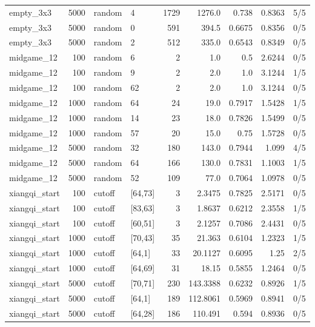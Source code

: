 \begin{table}[!t]
\begin{tabular}{lrllrrrrl}
empty\_3x3 & 5000 & random & 4 & 1729 & 1276.0 & 0.738 & 0.8363 & 5/5 \\
empty\_3x3 & 5000 & random & 0 & 591 & 394.5 & 0.6675 & 0.8356 & 0/5 \\
empty\_3x3 & 5000 & random & 2 & 512 & 335.0 & 0.6543 & 0.8349 & 0/5 \\
midgame\_12 & 100 & random & 6 & 2 & 1.0 & 0.5 & 2.6244 & 0/5 \\
midgame\_12 & 100 & random & 9 & 2 & 2.0 & 1.0 & 3.1244 & 1/5 \\
midgame\_12 & 100 & random & 62 & 2 & 2.0 & 1.0 & 3.1244 & 0/5 \\
midgame\_12 & 1000 & random & 64 & 24 & 19.0 & 0.7917 & 1.5428 & 1/5 \\
midgame\_12 & 1000 & random & 14 & 23 & 18.0 & 0.7826 & 1.5499 & 0/5 \\
midgame\_12 & 1000 & random & 57 & 20 & 15.0 & 0.75 & 1.5728 & 0/5 \\
midgame\_12 & 5000 & random & 32 & 180 & 143.0 & 0.7944 & 1.099 & 4/5 \\
midgame\_12 & 5000 & random & 64 & 166 & 130.0 & 0.7831 & 1.1003 & 1/5 \\
midgame\_12 & 5000 & random & 52 & 109 & 77.0 & 0.7064 & 1.0978 & 0/5 \\
xiangqi\_start & 100 & cutoff & [64,73] & 3 & 2.3475 & 0.7825 & 2.5171 & 0/5 \\
xiangqi\_start & 100 & cutoff & [83,63] & 3 & 1.8637 & 0.6212 & 2.3558 & 1/5 \\
xiangqi\_start & 100 & cutoff & [60,51] & 3 & 2.1257 & 0.7086 & 2.4431 & 0/5 \\
xiangqi\_start & 1000 & cutoff & [70,43] & 35 & 21.363 & 0.6104 & 1.2323 & 1/5 \\
xiangqi\_start & 1000 & cutoff & [64,1] & 33 & 20.1127 & 0.6095 & 1.25 & 2/5 \\
xiangqi\_start & 1000 & cutoff & [64,69] & 31 & 18.15 & 0.5855 & 1.2464 & 0/5 \\
xiangqi\_start & 5000 & cutoff & [70,71] & 230 & 143.3388 & 0.6232 & 0.8926 & 1/5 \\
xiangqi\_start & 5000 & cutoff & [64,1] & 189 & 112.8061 & 0.5969 & 0.8941 & 0/5 \\
xiangqi\_start & 5000 & cutoff & [64,28] & 186 & 110.491 & 0.594 & 0.8936 & 0/5 \\
\bottomrule
\end{tabular}
\end{table}

